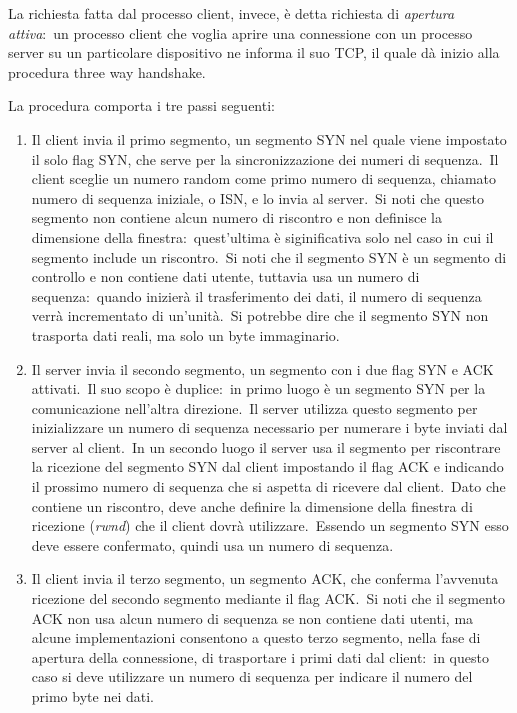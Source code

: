La richiesta fatta dal processo client, invece, è detta richiesta di \emph{apertura attiva}:\ un processo client che voglia aprire una connessione con un processo server su un particolare dispositivo ne informa il suo TCP, il quale dà inizio alla procedura three way handshake.

La procedura comporta i tre passi seguenti:
\begin{enumerate}
    \item Il client invia il primo segmento, un segmento SYN nel quale viene impostato il solo flag SYN, che serve per la sincronizzazione dei numeri di sequenza.\
          Il client sceglie un numero random come primo numero di sequenza, chiamato numero di sequenza iniziale, o ISN, e lo invia al server.\
          Si noti che questo segmento non contiene alcun numero di riscontro e non definisce la dimensione della finestra:\ quest'ultima è siginificativa solo nel caso in cui il segmento include un riscontro.\
          Si noti che il segmento SYN è un segmento di controllo e non contiene dati utente, tuttavia usa un numero di sequenza:\ quando inizierà il trasferimento dei dati, il numero di sequenza verrà incrementato di un'unità.\
          Si potrebbe dire che il segmento SYN non trasporta dati reali, ma solo un byte immaginario.
    \item Il server invia il secondo segmento, un segmento con i due flag SYN e ACK attivati.\
          Il suo scopo è duplice:\ in primo luogo è un segmento SYN per la comunicazione nell'altra direzione.\
          Il server utilizza questo segmento per inizializzare un numero di sequenza necessario per numerare i byte inviati dal server al client.\
          In un secondo luogo il server usa il segmento per riscontrare la ricezione del segmento SYN dal client impostando il flag ACK e indicando il prossimo numero di sequenza che si aspetta di ricevere dal client.\
          Dato che contiene un riscontro, deve anche definire la dimensione della finestra di ricezione (\emph{rwnd}) che il client dovrà utilizzare.\
          Essendo un segmento SYN esso deve essere confermato, quindi usa un numero di sequenza.
    \item Il client invia il terzo segmento, un segmento ACK, che conferma l'avvenuta ricezione del secondo segmento mediante il flag ACK.\
          Si noti che il segmento ACK non usa alcun numero di sequenza se non contiene dati utenti, ma alcune implementazioni consentono a questo terzo segmento, nella fase di apertura della connessione, di trasportare i primi dati dal client:\ in questo caso si deve utilizzare un numero di sequenza per indicare il numero del primo byte nei dati.
\end{enumerate}

